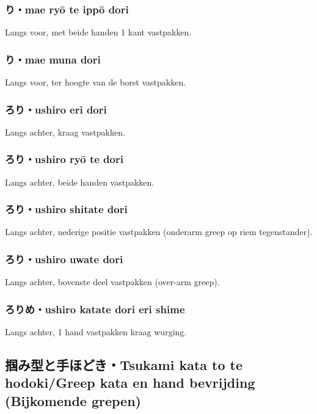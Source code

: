 \subsubsection{り・mae ry\={o} te ipp\={o} dori}
Langs voor, met beide handen 1 kant vastpakken.

\subsubsection{り・mae muna dori}
Langs voor, ter hoogte van de borst vastpakken.

\subsubsection{ろり・ushiro eri dori}
Langs achter, kraag vastpakken.

\subsubsection{ろり・ushiro ry\={o} te dori}
Langs achter, beide handen vastpakken.

\subsubsection{ろり・ushiro shitate dori}
Langs achter, nederige positie vastpakken (onderarm greep op riem tegenstander).

\subsubsection{ろり・ushiro uwate dori}
Langs achter, bovenste deel vastpakken (over-arm greep).

\subsubsection{ろりめ・ushiro katate dori eri shime}
Langs achter, 1 hand vastpakken kraag wurging.

\subsection{掴み型と手ほどき・Tsukami kata to te hodoki/Greep kata en hand bevrijding (Bijkomende grepen)}
